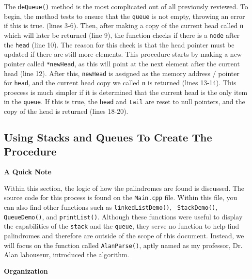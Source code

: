 \documentclass[letterpaper, 10pt]{article}
\begin{document}
The \texttt{deQueue()} method is the most complicated out of all previously reviewed. To begin, the method tests to ensure that the \texttt{queue} is not empty, throwing an error if this is true. (lines 3-6). Then, after making a copy of the current head called \texttt{n} which will later be returned (line 9), the function checks if there is a \texttt{node} after the \texttt{head} (line 10). The reason for this check is that the head pointer must be updated if there are still more elements. This procedure starts by making a new pointer called \texttt{*newHead}, as this will point at the next element after the current head (line 12). After this, \texttt{newHead} is assigned as the memory address /  pointer for \texttt{head}, and the current head copy we called \texttt{n} is returned (lines 13-14). This proecess is much simpler if it is determined that the current head is the only item in the \texttt{queue}. If this is true, the \texttt{head} and \texttt{tail} are reset to null pointers, and the copy of the head is returned (lines 18-20).

\subsection{Using Stacks and Queues To Create The Procedure}
\textbf{A Quick Note}

Within this section, the logic of how the palindromes are found is discussed. The source code for this process is found on the \texttt{Main.cpp} file. Within this file, you can also find other functions such as \texttt{linkedListDemo()}, \texttt{ StackDemo()}, \texttt{QueueDemo()}, and \texttt{printList()}. Although these functions were useful to display the capabilities of the \texttt{stack} and the \texttt{queue}, they serve no function to help find palindromes and therefore are outside of the scope of this document. Instead, we will focus on the function called \texttt{AlanParse()}, aptly named as my professor, Dr. Alan labouseur, introduced the algorithm.
\vspace{2.5em}

\textbf{Organization}
\end{document}

